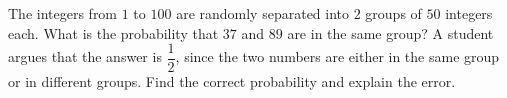 The integers from $1$ to $100$ are randomly separated into $2$ groups of $50$ integers each. What is the probability that $37$ and $89$ are in the same group? A student argues that the answer is $\dfrac{1}{2}$, since the two numbers are either in the same group or in different groups. Find the correct probability and explain the error.
